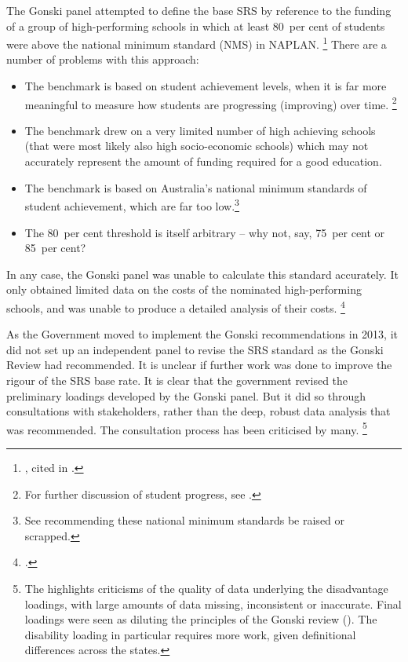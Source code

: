 \documentclass{grattan}
\begin{document}
The Gonski panel attempted to define the base SRS by reference to the funding of a group of high-performing schools in which at least 80~per cent of students were above the national minimum standard (NMS) in NAPLAN.%
\footnote{\textcite{Justman2013WhatsWrongGonski}, cited in \textcite{SenBackn.d.GovernmentSenatorsDissenting}.}
There are a number of problems with this approach:

\begin{itemize}[itemsep=1.2ex]
\item The benchmark is based on student achievement levels, when it is far more meaningful to measure how students are progressing (improving) over time.%
\footnote{For further discussion of student progress, see \textcites{Goss2016Wideninggapswhat}{Jensen2010MeasuringWhatMatters}.}
\item The benchmark drew on a very limited number of high achieving schools (that were most likely also high socio-economic schools) which may not accurately represent the amount of funding required for a good education.
\item The benchmark is based on Australia's national minimum standards of student achievement, which are far too low.\footnote{See \textcite{Goss2016Wideninggapswhat}  recommending these national minimum standards be raised or scrapped.}
\item The 80~per cent threshold is itself arbitrary -- why not, say, 75~per cent or 85~per cent?
\end{itemize}

In any case, the Gonski panel was unable to calculate this standard accurately. It only obtained limited data on the costs of the nominated high-performing schools, and was unable to produce a detailed analysis of their costs.%
\footnote{\textcite{NCA2014TowardsResponsibleGovernment}.}

As the Government moved to implement the Gonski recommendations in 2013, it did not set up an independent panel to revise the SRS standard as the Gonski Review had recommended. It is unclear if further work was done to improve the rigour of the SRS base rate. It is clear that the government revised the preliminary loadings developed by the Gonski panel. But it did so through consultations with stakeholders, rather than the deep, robust data analysis that was recommended. The consultation process has been criticised by many.%
\footnote{The \textcite{NCA2014TowardsResponsibleGovernment} highlights criticisms of the quality of data underlying the disadvantage loadings, with large amounts of data missing, inconsistent or inaccurate. Final loadings were seen as diluting the principles of the Gonski review (\textcite[][42]{Connors2015ImperativesSchoolsFunding}).
The disability loading in particular requires more work, given definitional differences across the states.}
\end{document}
